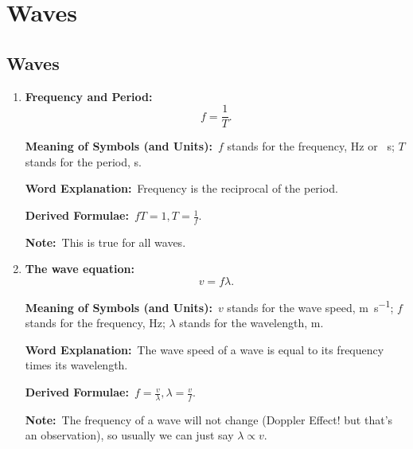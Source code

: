 \documentclass[8pt]{article}
\newcommand{\MeanSymb}{\textbf{Meaning of Symbols (and Units):}\ }
\newcommand{\WordExpl}{\textbf{Word Explanation:}\ }
\newcommand{\DeriForm}{\textbf{Derived Formulae:}\ }
\newcommand{\Note}{\textbf{Note:}\ }
\begin{document}
    \section{Waves}
        \subsection{Waves}
            \begin{enumerate}
                \item \textbf{Frequency and Period:}
                \[
                    f = \frac{1}{T}.
                \]

                \MeanSymb \(f\) stands for the frequency, \unit{\hertz} or \unit{\per \second}; \(T\) stands for the period, \unit{\second}.

                \WordExpl Frequency is the reciprocal of the period.

                \DeriForm \(fT = 1, T = \frac{1}{f}\).

                \Note This is true for all waves.

                \item \textbf{The wave equation:}
                \[
                    v = f \lambda.
                \]

                \MeanSymb \(v\) stands for the wave speed, \unit{\metre \per \second}; \(f\) stands for the frequency, \unit{\hertz}; \(\lambda\) stands for the wavelength, \unit{\metre}.

                \WordExpl The wave speed of a wave is equal to its frequency times its wavelength.

                \DeriForm \(f = \frac{v}{\lambda}, \lambda = \frac{v}{f}\).

                \Note The frequency of a wave will not change (Doppler Effect! but that's an observation), so usually we can just say \(\lambda \propto v\).
            \end{enumerate}
\end{document}
